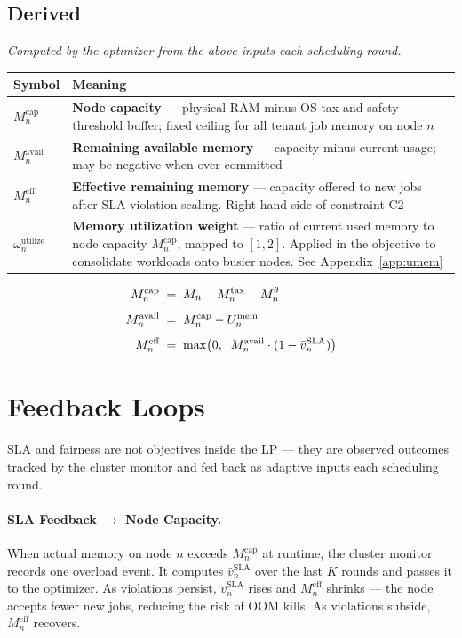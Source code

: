 \documentclass[11pt]{article}
\newcommand{\vbarsla}{\bar{v}_n^{\text{SLA}}}
\newcommand{\Meff}{M_n^{\text{eff}}}
\newcommand{\Mcap}{M_n^{\text{cap}}}
\newcommand{\Mavail}{M_n^{\text{avail}}}
\newcommand{\Mtax}{M_n^{\text{tax}}}
\newcommand{\Mtheta}{M_n^{\theta}}
\newcommand{\omutilize}{\omega_n^{\text{utilize}}}
\newcommand{\Umem}{U_n^{\text{mem}}}
\begin{document}
\subsection*{Derived}
\textit{Computed by the optimizer from the above inputs each scheduling round.}

\medskip
\begin{center}
\begin{tabular}{@{}l p{10.5cm}@{}}
\toprule
Symbol & Meaning \\
\midrule
$\Mcap$  & \textbf{Node capacity} --- physical RAM minus OS tax and safety
  threshold buffer; fixed ceiling for all tenant job memory on node $n$ \\[6pt]
$\Mavail$ & \textbf{Remaining available memory} --- capacity minus current
  usage; may be negative when over-committed \\[6pt]
$\Meff$  & \textbf{Effective remaining memory} --- capacity offered to new
  jobs after SLA violation scaling. Right-hand side of constraint C2 \\[6pt]
$\omutilize$  & \textbf{Memory utilization weight} --- ratio of current used memory
  to node capacity $\Mcap$, mapped to $[1,2]$. Applied in the objective to
  consolidate workloads onto busier nodes.
  See Appendix~\ref{app:umem} \\
\bottomrule
\end{tabular}
\end{center}

\begin{align}
  \Mcap    &\;=\; M_n - \Mtax - \Mtheta \notag \\[4pt]
  \Mavail  &\;=\; \Mcap - \Umem \notag \\[4pt]
  \Meff    &\;=\; \max\!\left(0,\;\; \Mavail \cdot (1 - \vbarsla)\right) \notag
\end{align}

\section{Feedback Loops}

SLA and fairness are not objectives inside the LP --- they are observed
outcomes tracked by the cluster monitor and fed back as adaptive inputs each
scheduling round.

\paragraph{SLA Feedback $\rightarrow$ Node Capacity.}
When actual memory on node $n$ exceeds $\Mcap$ at runtime, the cluster
monitor records one overload event. It computes $\vbarsla$ over the last $K$
rounds and passes it to the optimizer. As violations persist, $\vbarsla$ rises
and $\Meff$ shrinks --- the node accepts fewer new jobs, reducing the risk of
OOM kills. As violations subside, $\Meff$ recovers.
\end{document}
